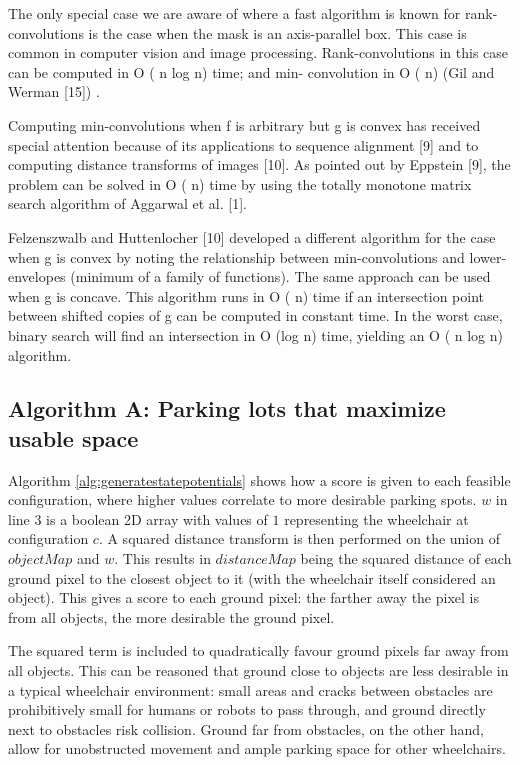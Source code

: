 The only special case we are aware of where a fast algorithm is known for
rank-convolutions is the case when the mask is an axis-parallel box. This case
is common in computer vision and image processing. Rank-convolutions in this
case can be computed in O ( n log n) time; and min- convolution in O ( n) (Gil
and Werman [15]) \cite{babai2009computing}.

Computing min-convolutions when f is arbitrary but g is convex has received
special attention because of its applications to sequence alignment [9] and to
computing distance transforms of images [10]. As pointed out by Eppstein [9],
the problem can be solved in O ( n) time by using the totally monotone matrix
search algorithm of Aggarwal et al. [1].
\cite{babai2009computing}

Felzenszwalb and Huttenlocher [10] developed a different algorithm for the case
when g is convex by noting the relationship between min-convolutions and
lower-envelopes (minimum of a family of functions). The same approach can be
used when g is concave. This algorithm runs in O ( n) time if an intersection
point between shifted copies of g can be computed in constant time. In the worst
case, binary search will find an intersection in O (log n) time, yielding an O (
n log n) algorithm.
\cite{babai2009computing}

\subsection{Algorithm A: Parking lots that maximize usable space}
Algorithm \autoref{alg:generatestatepotentials} shows how a score is given to each
feasible configuration, where higher values correlate to more desirable parking
spots. $w$ in line 3 is a boolean 2D array with values of $1$ representing the
wheelchair at configuration $c$. A squared distance transform is then performed
on the union of $objectMap$ and $w$. This results in $distanceMap$ being the
squared distance of each ground pixel to the closest object to it (with the
wheelchair itself considered an object). This gives a score to each ground pixel:
the farther away the pixel is from all objects, the more desirable the ground
pixel. 

The squared term is included to quadratically favour ground pixels far
away from all objects. This can be reasoned that ground close to objects are less
desirable in a typical wheelchair environment: small areas and cracks between
obstacles are prohibitively small for humans or robots to pass through, and
ground directly next to obstacles risk collision. Ground far from obstacles, on
the other hand, allow for unobstructed movement and ample parking space for
other wheelchairs.

